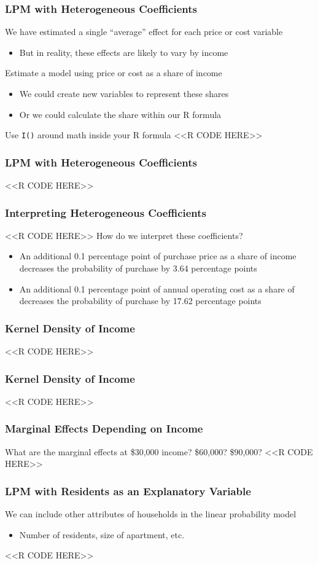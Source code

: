 \documentclass{beamer}
\begin{document}
\begin{frame}[fragile]\frametitle{LPM with Heterogeneous Coefficients}
    We have estimated a single ``average'' effect for each price or cost variable
    \begin{itemize}
        \item But in reality, these effects are likely to vary by income
    \end{itemize}
    \vspace{2ex}
    Estimate a model using price or cost as a share of income
    \begin{itemize}
        \item We could create new variables to represent these shares
        \item Or we could calculate the share within our R formula
    \end{itemize}
    \vspace{2ex}
    Use \texttt{I()} around math inside your R formula
    <<R CODE HERE>>
\end{frame}

\begin{frame}[fragile]\frametitle{LPM with Heterogeneous Coefficients}
    <<R CODE HERE>>
\end{frame}

\begin{frame}[fragile]\frametitle{Interpreting Heterogeneous Coefficients}
    <<R CODE HERE>>
    \vspace{2ex}
    How do we interpret these coefficients?
    \begin{itemize}
        \item An additional 0.1 percentage point of purchase price as a share of income decreases the probability of purchase by 3.64 percentage points
        \item An additional 0.1 percentage point of annual operating cost as a share of decreases the probability of purchase by 17.62 percentage points
    \end{itemize}
\end{frame}

\begin{frame}[fragile]\frametitle{Kernel Density of Income}
    <<R CODE HERE>>
\end{frame}

\begin{frame}[fragile]\frametitle{Kernel Density of Income}
    <<R CODE HERE>>
\end{frame}

\begin{frame}[fragile]\frametitle{Marginal Effects Depending on Income}
    What are the marginal effects at \$30,000 income? \$60,000? \$90,000?
    <<R CODE HERE>>
\end{frame}

\begin{frame}[fragile]\frametitle{LPM with Residents as an Explanatory Variable}
    We can include other attributes of households in the linear probability model
    \begin{itemize}
        \item Number of residents, size of apartment, etc.
    \end{itemize}
    <<R CODE HERE>>
\end{frame}
\end{document}
